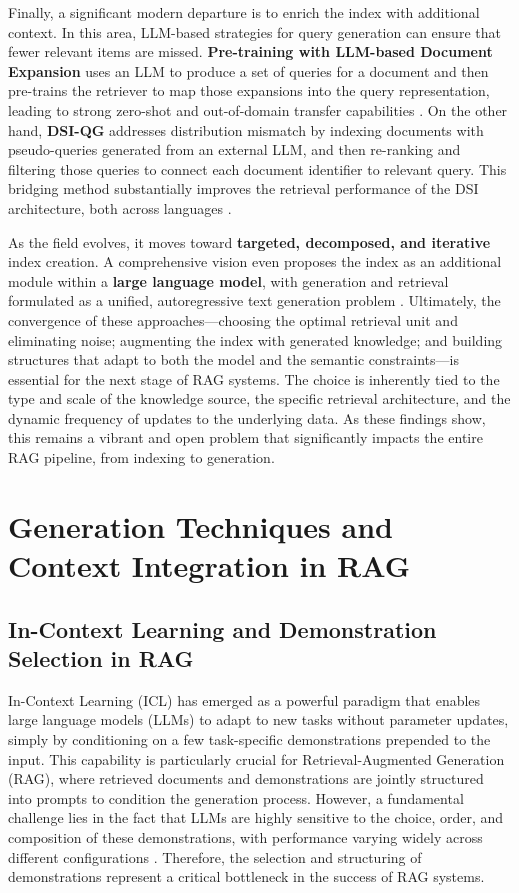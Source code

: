 \documentclass[11pt]{article}
\begin{document}
Finally, a significant modern departure is to enrich the index with additional context. In this area, LLM-based strategies for query generation can ensure that fewer relevant items are missed. \textbf{Pre-training with LLM-based Document Expansion} uses an LLM to produce a set of queries for a document and then pre-trains the retriever to map those expansions into the query representation, leading to strong zero-shot and out-of-domain transfer capabilities \cite{ref122}. On the other hand, \textbf{DSI-QG} addresses distribution mismatch by indexing documents with pseudo-queries generated from an external LLM, and then re-ranking and filtering those queries to connect each document identifier to relevant query. This bridging method substantially improves the retrieval performance of the DSI architecture, both across languages \cite{ref123}.

As the field evolves, it moves toward \textbf{targeted, decomposed, and iterative} index creation. A comprehensive vision even proposes the index as an additional module within a \textbf{large language model}, with generation and retrieval formulated as a unified, autoregressive text generation problem \cite{ref124}. Ultimately, the convergence of these approaches---choosing the optimal retrieval unit and eliminating noise; augmenting the index with generated knowledge; and building structures that adapt to both the model and the semantic constraints---is essential for the next stage of RAG systems. The choice is inherently tied to the type and scale of the knowledge source, the specific retrieval architecture, and the dynamic frequency of updates to the underlying data. As these findings show, this remains a vibrant and open problem that significantly impacts the entire RAG pipeline, from indexing to generation.

\section{Generation Techniques and Context Integration in RAG}

\subsection{In-Context Learning and Demonstration Selection in RAG}

In-Context Learning (ICL) has emerged as a powerful paradigm that enables large language models (LLMs) to adapt to new tasks without parameter updates, simply by conditioning on a few task-specific demonstrations prepended to the input. This capability is particularly crucial for Retrieval-Augmented Generation (RAG), where retrieved documents and demonstrations are jointly structured into prompts to condition the generation process. However, a fundamental challenge lies in the fact that LLMs are highly sensitive to the choice, order, and composition of these demonstrations, with performance varying widely across different configurations \cite{ref125,ref126}. Therefore, the selection and structuring of demonstrations represent a critical bottleneck in the success of RAG systems.
\end{document}
